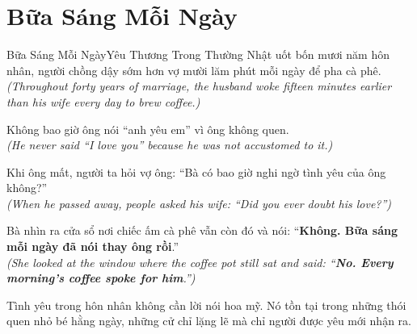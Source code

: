 \section{Bữa Sáng Mỗi Ngày}
\begin{truyen}{Bữa Sáng Mỗi Ngày}{Yêu Thương Trong Thường Nhật}
uốt bốn mươi năm hôn nhân, người chồng dậy sớm hơn vợ mười lăm phút mỗi ngày để pha cà phê.\\
\textit{(Throughout forty years of marriage, the husband woke fifteen minutes earlier than his wife every day to brew coffee.)}

Không bao giờ ông nói ``anh yêu em'' vì ông không quen.\\
\textit{(He never said ``I love you'' because he was not accustomed to it.)}

Khi ông mất, người ta hỏi vợ ông: ``Bà có bao giờ nghi ngờ tình yêu của ông không?''\\
\textit{(When he passed away, people asked his wife: ``Did you ever doubt his love?'')}

Bà nhìn ra cửa sổ nơi chiếc ấm cà phê vẫn còn đó và nói: ``\textbf{Không. Bữa sáng mỗi ngày đã nói thay ông rồi}.''\\
\textit{(She looked at the window where the coffee pot still sat and said: ``\textbf{No. Every morning's coffee spoke for him}.'')}
\end{truyen}
\begin{baihoc}
  Tình yêu trong hôn nhân không cần lời nói hoa mỹ. Nó tồn tại trong những thói quen nhỏ bé hằng ngày, những cử chỉ lặng lẽ mà chỉ người được yêu mới nhận ra.
\end{baihoc}

